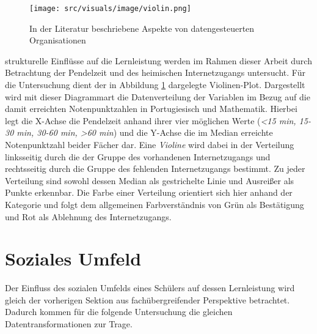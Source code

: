 \begin{figure}[htb]
    \centering
    \texttt{[image: src/visuals/image/violin.png]}
    \caption{In der Literatur beschriebene Aspekte von datengesteuerten Organisationen}
    \label{fig:violin}
\end{figure}

strukturelle Einflüsse auf die Lernleistung werden im Rahmen dieser Arbeit durch Betrachtung der Pendelzeit und des heimischen Internetzugangs untersucht.
Für die Untersuchung dient der in Abbildung \ref{fig:violin} dargelegte Violinen-Plot.
Dargestellt wird mit dieser Diagrammart die Datenverteilung der Variablen im Bezug auf die damit erreichten Notenpunktzahlen in Portugiesisch und Mathematik.
Hierbei legt die X-Achse die Pendelzeit anhand ihrer vier möglichen Werte (\textit{<15 min, 15-30 min, 30-60 min, >60 min}) und die Y-Achse die im Median erreichte Notenpunktzahl beider Fächer dar.
Eine \textit{Violine} wird dabei in der Verteilung linksseitig durch die der Gruppe des vorhandenen Internetzugangs und rechtsseitig durch die Gruppe des fehlenden Internetzugangs bestimmt.
Zu jeder Verteilung sind sowohl dessen Median als gestrichelte Linie und Ausreißer als Punkte erkennbar.
Die Farbe einer Verteilung orientiert sich hier anhand der Kategorie und folgt dem allgemeinen Farbverständnis von Grün als Bestätigung und Rot als Ablehnung des Internetzugangs.


\section{Soziales Umfeld}


Der Einfluss des sozialen Umfelds eines Schülers auf dessen Lernleistung wird gleich der vorherigen Sektion aus fachübergreifender Perspektive betrachtet.
Dadurch kommen für die folgende Untersuchung die gleichen Datentransformationen zur Trage.

